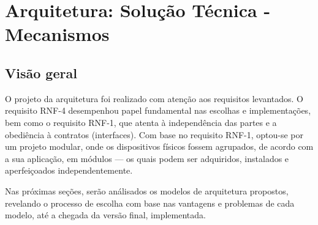 \chapter{Arquitetura: Solução Técnica - Mecanismos}

\section{Visão geral}

O projeto da arquitetura foi realizado com atenção aos requisitos levantados. O requisito RNF-4 desempenhou papel fundamental nas escolhas e implementações, bem como o requisito RNF-1, que atenta à independência das partes e a obediência à contratos (interfaces). Com base no requisito RNF-1, optou-se por um projeto modular, onde os dispositivos físicos fossem agrupados, de acordo com a sua aplicação, em módulos --- os quais podem ser adquiridos, instalados e aperfeiçoados independentemente.

Nas próximas seções, serão análisados os modelos de arquitetura propostos, revelando o processo de escolha com base nas vantagens e problemas de cada modelo, até a chegada da versão final, implementada. 













